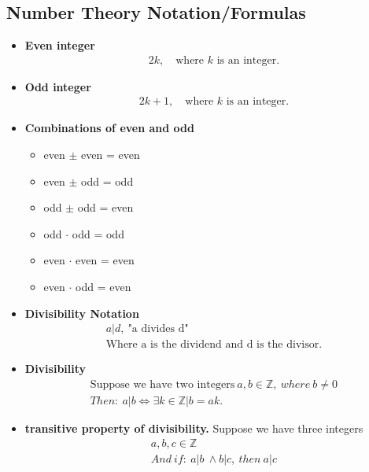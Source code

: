 \documentclass{report}
\begin{document}
      \subsection{Number Theory Notation/Formulas}
      \bigbreak \noindent 
      \begin{itemize}
        \item \textbf{Even integer}
          \begin{align*}
            2k, \quad \text{where $k $ is an integer}
          .\end{align*}
        \item \textbf{Odd integer}
          \begin{align*}
            2k + 1, \quad \text{where $k $ is an integer}
          .\end{align*}
        \item \textbf{Combinations of even and odd}
          \begin{itemize}
            \item even $\pm $ even = even
            \item even $\pm $ odd  = odd
            \item odd $\pm $ odd = even
            \item odd $\cdot$ odd = odd
            \item even $\cdot$ even = even
            \item even $\cdot$ odd = even
          \end{itemize}
        \item \textbf{Divisibility Notation}
          \begin{align*}
            a | d,\ \text{"a divides d"} \\
            \text{Where a is the dividend and d is the divisor}
          .\end{align*}
        \item \textbf{Divisibility}
          \begin{align*}
            \text{Suppose we have two integers}\ a, b \in \mathbb{Z},\ where\ b \ne 0 \\
            Then:\ a|b \iff \exists k \in \mathbb{Z} | b = ak
          .\end{align*}
        \item \textbf{transitive property of divisibility.} Suppose we have three integers
          \begin{align*}
            a,b,c \in \mathbb{Z}\\
            And\ if:\ a|b\ \land b|c,\ then\ a|c

\end{align*}
\end{itemize}
\end{document}
